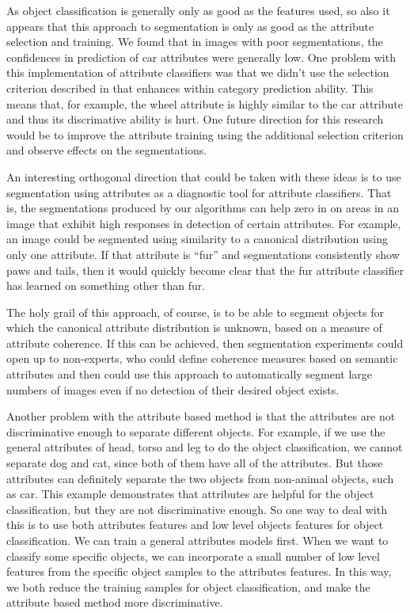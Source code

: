 \documentclass[10pt,twocolumn,letterpaper]{article}
\begin{document}
As object classification is generally only as good as the features used, so also it
appears that this approach to segmentation is only as good as the attribute
selection and training.  We found that in images with poor segmentations, the
confidences in prediction of car attributes were generally low.  One problem
with this implementation of attribute classifiers was that we didn't use
the selection criterion described in \cite{farhadi09} that enhances within
category prediction ability.  This means that, for example, the wheel attribute
is highly similar to the car attribute and thus its discrimative ability
is hurt.  One future direction for this research would be to improve the attribute
training using the additional selection criterion and observe effects on
the segmentations.

An interesting orthogonal direction that could be taken with these ideas is to
use segmentation using attributes as a diagnostic tool for attribute classifiers.
That is, the segmentations produced by our algorithms can help zero in on areas
in an image that exhibit high responses in detection of certain attributes.
For example, an image could be segmented using similarity to a canonical distribution
using only one attribute.  If that attribute is ``fur'' and segmentations
consistently show paws and tails, then it would quickly become clear that
the fur attribute classifier has learned on something other than fur.

The holy grail of this approach, of course, is to be able to segment objects
for which the canonical attribute distribution is unknown, based on a measure
of attribute coherence.  If this can be achieved, then segmentation experiments
could open up to non-experts, who could define coherence measures based on
semantic attributes and then could use this approach to automatically segment large
numbers of images even if no detection of their desired object exists.

Another problem with the attribute based method is that the attributes are not discriminative 
enough to separate different objects. For example, if we use the general attributes of head, torso and leg to 
do the object classification, we cannot separate dog and cat, since both of them have all of the attributes. 
But those attributes can definitely separate the two objects from non-animal objects, such as car. This example demonstrates that 
attributes are helpful for the object classification, but they are not discriminative enough. So one way to deal with this is to use 
both attributes features and low level objects features for object classification. We can train a general attributes models first. 
When we want to classify some specific objects, we can incorporate a small number of low level features from the specific object samples to the attributes 
features. In this way, we both reduce the training samples for object classification, and make the attribute based method more discriminative.
\end{document}

